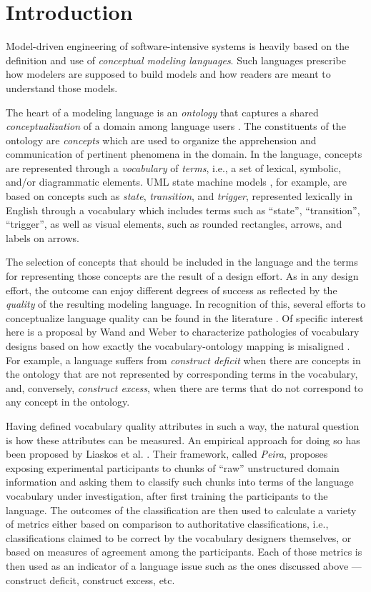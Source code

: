 \section{Introduction}

Model-driven engineering of software-intensive systems is heavily based on the definition and use of \textit{conceptual modeling languages}. Such languages prescribe how modelers are supposed to build models and how readers are meant to understand those models. 

The heart of a modeling language is an \textit{ontology} that captures a shared \textit{conceptualization} of a domain among language users \cite{Guiz.07}. The constituents of the ontology are \textit{concepts} which are used to organize the apprehension and communication of pertinent phenomena in the domain. In the language, concepts are represented through a \textit{vocabulary} of \textit{terms}, i.e., a set of lexical, symbolic, and/or diagrammatic elements. UML state machine models \cite{UML.17}, for example, are based on concepts such as \textit{state}, \textit{transition}, and \textit{trigger}, represented lexically in English through a vocabulary which includes terms such as ``state'', ``transition'', ``trigger'', as well as visual elements, such as rounded rectangles, arrows, and labels on arrows. 

The selection of concepts that should be included in the language and the terms for representing those concepts are the result of a design effort. As in any design effort, the outcome can enjoy different degrees of success as reflected by the \textit{quality} of the resulting modeling language. In recognition of this, several efforts to conceptualize language quality can be found in the literature \cite{Krog.12,NePG.12,WaWe.93,Mood.09}. 
Of specific interest here is a proposal by Wand and Weber to characterize pathologies of vocabulary designs based on how exactly the vocabulary-ontology mapping is misaligned \cite{WaWe.93}. For example, a language suffers from \textit{construct deficit} when there are concepts in the ontology that are not represented by corresponding terms in the vocabulary, and, conversely, \textit{construct excess}, when there are terms that do not correspond to any concept in the ontology.

Having defined vocabulary quality attributes in such a way, the natural question is how these attributes can be measured. An empirical approach for doing so has been proposed by Liaskos et al. \cite{LZMK.24}. Their framework, called \textit{Peira}, proposes exposing experimental participants to chunks of ``raw'' unstructured domain information and asking them to classify such chunks into terms of the language vocabulary under investigation, after first training the participants to the language. The outcomes of the classification are then used to calculate a variety of metrics either based on comparison to authoritative classifications, i.e., classifications claimed to be correct by the vocabulary designers themselves, or based on measures of agreement among the participants. Each of those metrics is then used as an indicator of a language issue such as the ones discussed above --- construct deficit, construct excess, etc. 

